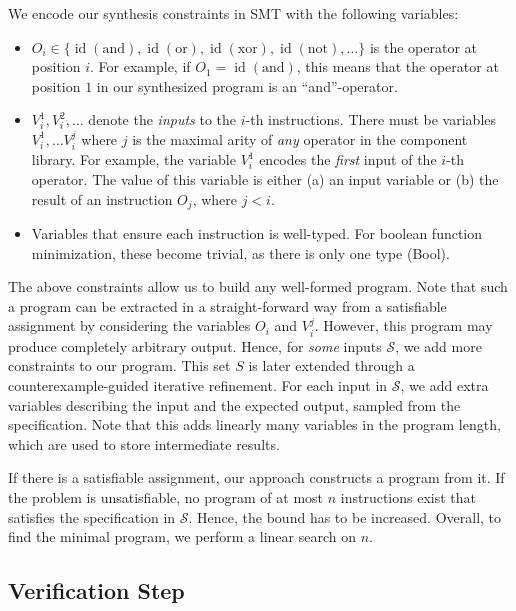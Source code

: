 \documentclass[a4paper]{article}
\DeclareMathOperator*{\id}{id}
\renewcommand{\S}{\mathcal{S}}
\begin{document}
We encode our synthesis constraints in SMT with the following variables:
\begin{itemize}
  \item $O_i \in \{\id(\text{and}), \id(\text{or}), \id(\text{xor}), \id(\text{not}), \dots\}$ is the operator at position $i$. For example, if $O_1 = \id(\text{and})$, this means that the operator at position $1$ in our synthesized program is an ``and''-operator. %
  \item $V_i^1, V_i^2, \dots$ denote the \emph{inputs} to the $i$-th instructions. There must be variables $V_i^1, \dots V_i^j$ where $j$ is the maximal arity of \emph{any} operator in the component library.
  For example, the variable $V_i^1$ encodes the \emph{first} input of the $i$-th operator. The value of this variable is either (a) an input variable or (b) the result of an instruction $O_j$, where $j < i$.
  \item Variables that ensure each instruction is well-typed. For boolean function minimization, these become trivial, as there is only one type (Bool).
\end{itemize}

The above constraints allow us to build any well-formed program. Note that such a program can be extracted in a straight-forward way from a satisfiable assignment by considering the variables $O_i$ and $V_i^j$.
However, this program may produce completely arbitrary output. Hence, for \emph{some} inputs $\S$, we add more constraints to our program. This set $S$ is later extended through a counterexample-guided iterative refinement.  %
For each input in $\S$, we add extra variables describing the input and the expected output, sampled from the specification. Note that this adds linearly many variables in the program length, which are used to store intermediate results.

If there is a satisfiable assignment, our approach constructs a program from it. If the problem is unsatisfiable, no program of at most $n$ instructions exist that satisfies the specification in $\S$. Hence, the bound has to be increased. Overall, to find the minimal program, we perform a linear search on $n$.

\subsection{Verification Step} \label{synth:verif-step}
\end{document}
